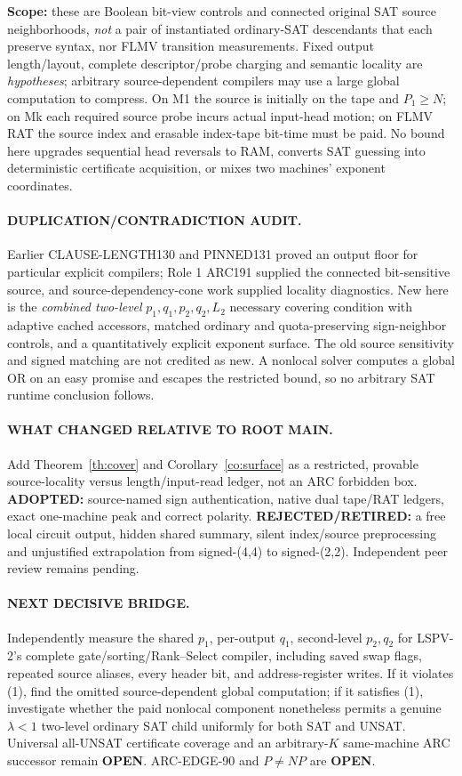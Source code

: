 \documentclass[11pt]{article}
\begin{document}
\textbf{Scope:} these are Boolean bit-view controls and connected original SAT source neighborhoods, \emph{not} a pair of instantiated ordinary-SAT descendants that each preserve syntax, nor FLMV transition measurements. Fixed output length/layout, complete descriptor/probe charging and semantic locality are \emph{hypotheses}; arbitrary source-dependent compilers may use a large global computation to compress. On M1 the source is initially on the tape and $P_1\ge N$; on Mk each required source probe incurs actual input-head motion; on FLMV RAT the source index and erasable index-tape bit-time must be paid. No bound here upgrades sequential head reversals to RAM, converts SAT guessing into deterministic certificate acquisition, or mixes two machines' exponent coordinates.

\paragraph{DUPLICATION/CONTRADICTION AUDIT.} Earlier CLAUSE-LENGTH130 and PINNED131 proved an output floor for particular explicit compilers; Role 1 ARC191 supplied the connected bit-sensitive source, and source-dependency-cone work supplied locality diagnostics. New here is the \emph{combined two-level} $p_1,q_1,p_2,q_2,L_2$ necessary covering condition with adaptive cached accessors, matched ordinary and quota-preserving sign-neighbor controls, and a quantitatively explicit exponent surface. The old source sensitivity and signed matching are not credited as new. A nonlocal solver computes a global OR on an easy promise and escapes the restricted bound, so no arbitrary SAT runtime conclusion follows.

\paragraph{WHAT CHANGED RELATIVE TO ROOT MAIN.} Add Theorem~\ref{th:cover} and Corollary~\ref{co:surface} as a restricted, provable source-locality versus length/input-read ledger, not an ARC forbidden box. \textbf{ADOPTED:} source-named sign authentication, native dual tape/RAT ledgers, exact one-machine peak and correct polarity. \textbf{REJECTED/RETIRED:} a free local circuit output, hidden shared summary, silent index/source preprocessing and unjustified extrapolation from signed-(4,4) to signed-(2,2). Independent peer review remains pending.

\paragraph{NEXT DECISIVE BRIDGE.} Independently measure the shared $p_1$, per-output $q_1$, second-level $p_2,q_2$ for LSPV-2's complete gate/sorting/Rank--Select compiler, including saved swap flags, repeated source aliases, every header bit, and address-register writes. If it violates (1), find the omitted source-dependent global computation; if it satisfies (1), investigate whether the paid nonlocal component nonetheless permits a genuine $\lambda<1$ two-level ordinary SAT child uniformly for both SAT and UNSAT. Universal all-UNSAT certificate coverage and an arbitrary-$K$ same-machine ARC successor remain \textbf{OPEN}. ARC-EDGE-90 and $P\ne NP$ are \textbf{OPEN}.
\end{document}
